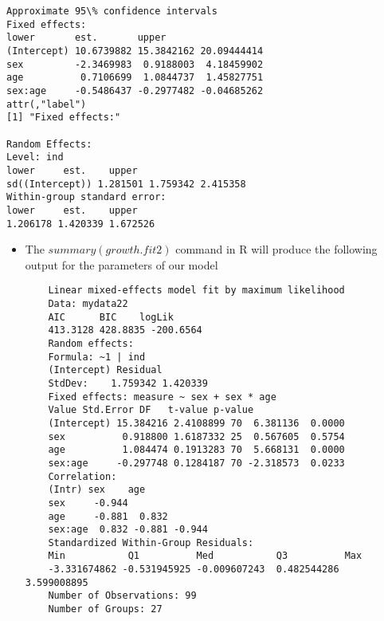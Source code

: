 \documentclass{beamer}
\begin{document}
\begin{frame}[fragile]
\begin{verbatim}
Approximate 95\% confidence intervals
Fixed effects:
lower       est.       upper
(Intercept) 10.6739882 15.3842162 20.09444414
sex         -2.3469983  0.9188003  4.18459902
age          0.7106699  1.0844737  1.45827751
sex:age     -0.5486437 -0.2977482 -0.04685262
attr(,"label")
[1] "Fixed effects:"

Random Effects:
Level: ind 
lower     est.    upper
sd((Intercept)) 1.281501 1.759342 2.415358
Within-group standard error:
lower     est.    upper 
1.206178 1.420339 1.672526 
\end{verbatim}
\end{frame}

{\scriptsize
\begin{frame}[fragile]
\begin{itemize}
	\item The $summary(growth.fit2)$ command in R will produce the following output for the parameters of our model
	\begin{verbatim}
	Linear mixed-effects model fit by maximum likelihood
	Data: mydata22 
	AIC      BIC    logLik
	413.3128 428.8835 -200.6564
	Random effects:
	Formula: ~1 | ind
	(Intercept) Residual
	StdDev:    1.759342 1.420339
	Fixed effects: measure ~ sex + sex * age 
	Value Std.Error DF   t-value p-value
	(Intercept) 15.384216 2.4108899 70  6.381136  0.0000
	sex          0.918800 1.6187332 25  0.567605  0.5754
	age          1.084474 0.1913283 70  5.668131  0.0000
	sex:age     -0.297748 0.1284187 70 -2.318573  0.0233
	Correlation: 
	(Intr) sex    age   
	sex     -0.944              
	age     -0.881  0.832       
	sex:age  0.832 -0.881 -0.944
	Standardized Within-Group Residuals:
	Min           Q1          Med           Q3          Max 
	-3.331674862 -0.531945925 -0.009607243  0.482544286  3.599008895 
	Number of Observations: 99
	Number of Groups: 27 
	\end{verbatim}
\end{itemize}
\end{frame}
}
\end{document}
